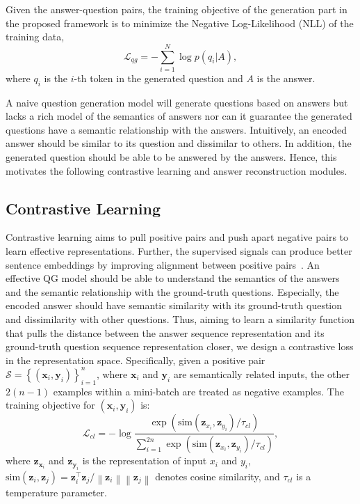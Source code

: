 \documentclass[11pt]{article}
\begin{document}
Given the answer-question pairs, the training objective of the generation part in the proposed framework is to minimize the Negative Log-Likelihood (NLL) of the training data,
\begin{equation}\label{eq:qg}
    \mathcal{L}_{qg}=-\sum_{i=1}^{N}\log p(q_{i}|A),
\end{equation}
where $q_{i}$ is the $i$-th token in the generated question and $A$ is the answer.

A naive question generation model will generate questions based on answers but lacks a rich model of the semantics of answers nor can it guarantee the generated questions have a semantic relationship with the answers. Intuitively, an encoded answer should be similar to its question and dissimilar to others. In addition, the generated question should be able to be answered by the answers. Hence, this motivates the following contrastive learning and answer reconstruction modules.

\subsection{Contrastive Learning}
\label{subsec:cl}

Contrastive learning aims to pull positive pairs and push apart negative pairs to learn effective representations. Further, the supervised signals can produce better sentence embeddings by improving alignment between positive pairs~\cite{chen-etal-2020-simple}. An effective QG model should be able to understand the semantics of the answers and the semantic relationship with the ground-truth questions. Especially, the encoded answer should have semantic similarity with its ground-truth question and dissimilarity with other questions. Thus, aiming to learn a similarity function that pulls the distance between the answer sequence representation and its ground-truth question sequence representation closer, we design a contrastive loss in the representation space. Specifically, given a positive pair $\mathcal{S}=\left\{(\textbf{x}_{i}, \textbf{y}_{i})  \right\}_{i=1}^{n}$, where $\textbf{x}_{i}$ and $\textbf{y}_{i}$ are semantically related inputs, the other $2(n-1)$ examples within a mini-batch are treated as negative examples. The training objective for $(\textbf{x}_{i}, \textbf{y}_{i})$ is:
\begin{equation}\label{eq:cl}
    \mathcal{L}_{cl}=-\log\frac{\exp(\text{sim}(\textbf{z}_{x_i},\textbf{z}_{y_i})/\tau_{cl})}{\sum_{i=1}^{2n}\exp(\text{sim}(\textbf{z}_{x_i},\textbf{z}_{y_i})/\tau_{cl})},
\end{equation}
where $\textbf{z}_{\textbf{x}_i}$ and $\textbf{z}_{\textbf{y}_i}$ is the representation of input $x_{i}$ and $y_{i}$, $\text{sim}(\textbf{z}_{i},\textbf{z}_{j})=\textbf{z}_{i}^{\top}\textbf{z}_{j}/\left\| \textbf{z}_{i} \right\|\left\| \textbf{z}_{j} \right\|$ denotes cosine similarity, and $\tau_{cl}$ is a temperature parameter.
\end{document}
